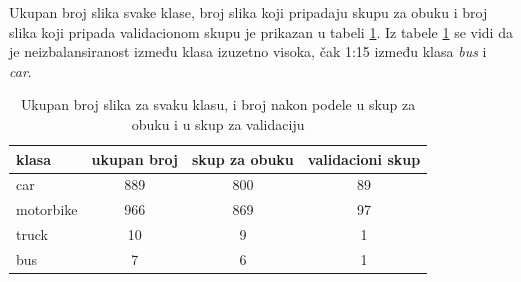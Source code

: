 \documentclass[12pt,oneside]{memoir}
\begin{document}
Ukupan broj slika svake klase, broj slika koji pripadaju skupu za obuku i broj slika koji pripada validacionom skupu je prikazan u tabeli \ref{tab:section4_dostpunipodaci}. Iz tabele \ref{tab:section4_dostpunipodaci} se vidi da je neizbalansiranost između klasa izuzetno visoka, čak 1:15 između klasa \textit{bus} i \textit{car}.

\begin{table}
    \begin{center}
    \caption{Ukupan broj slika za svaku klasu, i broj nakon podele u skup za obuku i u skup za validaciju }\label{tab:section4_dostpunipodaci}
    \begin{tabular}{l|c|c|c}
    klasa & ukupan broj & skup za obuku & validacioni skup\\ 
    \hline
    car & 889 & 800 & 89 \\
    motorbike & 966 & 869 & 97 \\
    truck & 10 & 9 & 1 \\
    bus & 7 & 6 & 1 \\
    \end{tabular}
    \end{center}
\end{table}
\end{document}

